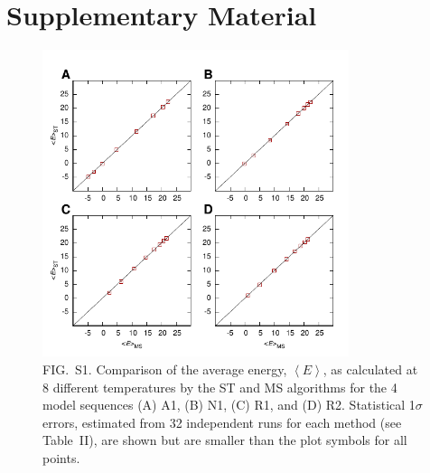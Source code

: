 \documentclass[12]{article}
\begin{document}
\section*{\LARGE{\textbf{Supplementary Material}}}

\begin{figure}[h]
\includegraphics[width=0.8\textwidth,center]{meanE}
\caption*{FIG.~S1. Comparison of the average energy, $\left < E\right >$, as calculated at 8 different temperatures by the ST and MS algorithms for the 4 model sequences (A) A1, (B) N1, (C) R1, and (D) R2. Statistical 1$\sigma$ errors, estimated from 32 independent runs for each method (see Table~II), are shown but are smaller than the plot symbols for all points.}
\end{figure}
\end{document}

